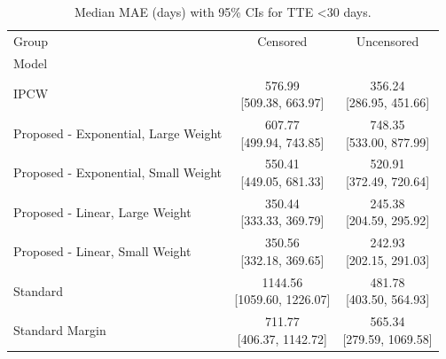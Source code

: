 \begin{table}
\caption{Median MAE (days) with 95\% CIs for TTE <30 days.}
\label{tab:mae_results_lt30}
\begin{tabular}{lcc}
\toprule
Group & Censored & Uncensored \\
Model &  &  \\
\midrule
IPCW & \makecell{576.99 \\ [509.38, 663.97]} & \makecell{356.24 \\ [286.95, 451.66]} \\
Proposed - Exponential, Large Weight & \makecell{607.77 \\ [499.94, 743.85]} & \makecell{748.35 \\ [533.00, 877.99]} \\
Proposed - Exponential, Small Weight & \makecell{550.41 \\ [449.05, 681.33]} & \makecell{520.91 \\ [372.49, 720.64]} \\
Proposed - Linear, Large Weight & \makecell{350.44 \\ [333.33, 369.79]} & \makecell{245.38 \\ [204.59, 295.92]} \\
Proposed - Linear, Small Weight & \makecell{350.56 \\ [332.18, 369.65]} & \makecell{242.93 \\ [202.15, 291.03]} \\
Standard & \makecell{1144.56 \\ [1059.60, 1226.07]} & \makecell{481.78 \\ [403.50, 564.93]} \\
Standard
Margin & \makecell{711.77 \\ [406.37, 1142.72]} & \makecell{565.34 \\ [279.59, 1069.58]} \\
\bottomrule
\end{tabular}
\end{table}
